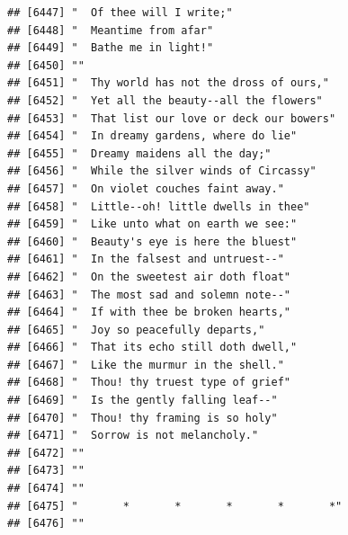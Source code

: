 \documentclass{article}\usepackage[]{graphicx}\usepackage[]{color}
\makeatletter
\newenvironment{kframe}{%
 \def\at@end@of@kframe{}%
 \ifinner\ifhmode%
  \def\at@end@of@kframe{\end{minipage}}%
  \begin{minipage}{\columnwidth}%
 \fi\fi%
 \def\FrameCommand##1{\hskip\@totalleftmargin \hskip-\fboxsep
 \colorbox{shadecolor}{##1}\hskip-\fboxsep
     \hskip-\linewidth \hskip-\@totalleftmargin \hskip\columnwidth}%
 \MakeFramed {\advance\hsize-\width
   \@totalleftmargin\z@ \linewidth\hsize
   \@setminipage}}%
 {\par\unskip\endMakeFramed%
 \at@end@of@kframe}
\newenvironment{knitrout}{}{} %
\makeatother
\begin{document}
\begin{knitrout}
\begin{kframe}
\begin{verbatim}
## [6447] "  Of thee will I write;"                                                     
## [6448] "  Meantime from afar"                                                        
## [6449] "  Bathe me in light!"                                                        
## [6450] ""                                                                            
## [6451] "  Thy world has not the dross of ours,"                                      
## [6452] "  Yet all the beauty--all the flowers"                                       
## [6453] "  That list our love or deck our bowers"                                     
## [6454] "  In dreamy gardens, where do lie"                                           
## [6455] "  Dreamy maidens all the day;"                                               
## [6456] "  While the silver winds of Circassy"                                        
## [6457] "  On violet couches faint away."                                             
## [6458] "  Little--oh! little dwells in thee"                                         
## [6459] "  Like unto what on earth we see:"                                           
## [6460] "  Beauty's eye is here the bluest"                                           
## [6461] "  In the falsest and untruest--"                                             
## [6462] "  On the sweetest air doth float"                                            
## [6463] "  The most sad and solemn note--"                                            
## [6464] "  If with thee be broken hearts,"                                            
## [6465] "  Joy so peacefully departs,"                                                
## [6466] "  That its echo still doth dwell,"                                           
## [6467] "  Like the murmur in the shell."                                             
## [6468] "  Thou! thy truest type of grief"                                            
## [6469] "  Is the gently falling leaf--"                                              
## [6470] "  Thou! thy framing is so holy"                                              
## [6471] "  Sorrow is not melancholy."                                                 
## [6472] ""                                                                            
## [6473] ""                                                                            
## [6474] ""                                                                            
## [6475] "       *       *       *       *       *"                                    
## [6476] ""                                                                            

\end{verbatim}
\end{kframe}
\end{knitrout}
\end{document}
